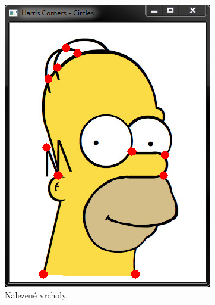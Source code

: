 \documentclass[12pt, a4paper]{article}
\begin{document}
{\begin{figure}[!ht]
\begin{minipage}[t]{0.49\textwidth}
		\includegraphics[width = \textwidth]{HarrisCornersCircles.png}
		\caption{Nalezené vrcholy.}
		\label{fig:HarrisCornersCircles}
	\end{minipage}%
	\hfill
	\begin{minipage}[t]{0.49\textwidth}

\end{minipage}
\end{figure}}
\end{document}
